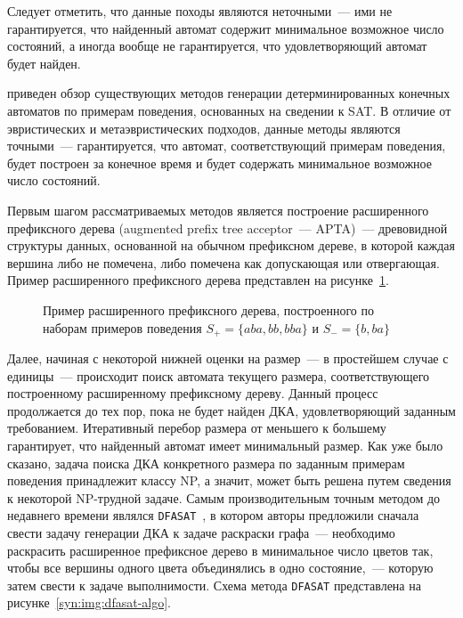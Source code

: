 Следует отметить, что данные походы являются неточными~--- ими не гарантируется, что найденный автомат содержит минимальное возможное число состояний, а иногда вообще не гарантируется, что удовлетворяющий автомат будет найден.

\insection{\ref{sec:review:sat-dfa-inf}} приведен обзор существующих методов генерации детерминированных конечных автоматов по примерам поведения, основанных на сведении к SAT. В отличие от эвристических и метаэвристических подходов, данные методы являются точными~--- гарантируется, что автомат, соответствующий примерам поведения, будет построен за конечное время и будет содержать минимальное возможное число состояний.

Первым шагом рассматриваемых методов является построение расширенного префиксного дерева (augmented prefix tree acceptor~--- APTA)~--- древовидной структуры данных, основанной на обычном префиксном дереве, в которой каждая вершина либо не помечена, либо помечена как допускающая или отвергающая. 
Пример расширенного префиксного дерева представлен на рисунке~\ref{syn:img:apta-ex}.

\begin{figure}[ht]
  \centering
  \ifafour
    
  \else
    
  \fi
  \caption{Пример расширенного префиксного дерева, построенного по наборам примеров поведения $S_{+} = \{aba, bb, bba\}$ и $S_{-} = \{b, ba\}$}
  \label{syn:img:apta-ex}
\end{figure}

Далее, начиная с некоторой нижней оценки на размер~--- в простейшем случае с единицы~--- происходит поиск автомата текущего размера, соответствующего построенному расширенному префиксному дереву. 
Данный процесс продолжается до тех пор, пока не будет найден ДКА, удовлетворяющий заданным требованием.
Итеративный перебор размера от меньшего к большему гарантирует, что найденный автомат имеет минимальный размер.
Как уже было сказано, задача поиска ДКА конкретного размера по заданным примерам поведения принадлежит классу NP, а значит, может быть решена путем сведения к некоторой NP-трудной задаче.
Самым производительным точным методом до недавнего времени являлся \texttt{DFASAT}~\cite{heule-icgi10}, в котором авторы предложили сначала свести задачу генерации ДКА к задаче раскраски графа~--- необходимо раскрасить расширенное префиксное дерево в минимальное число цветов так, чтобы все вершины одного цвета объединялись в одно состояние,~--- которую затем свести к задаче выполнимости.
Схема метода \texttt{DFASAT} представлена на рисунке~\ref{syn:img:dfasat-algo}.

